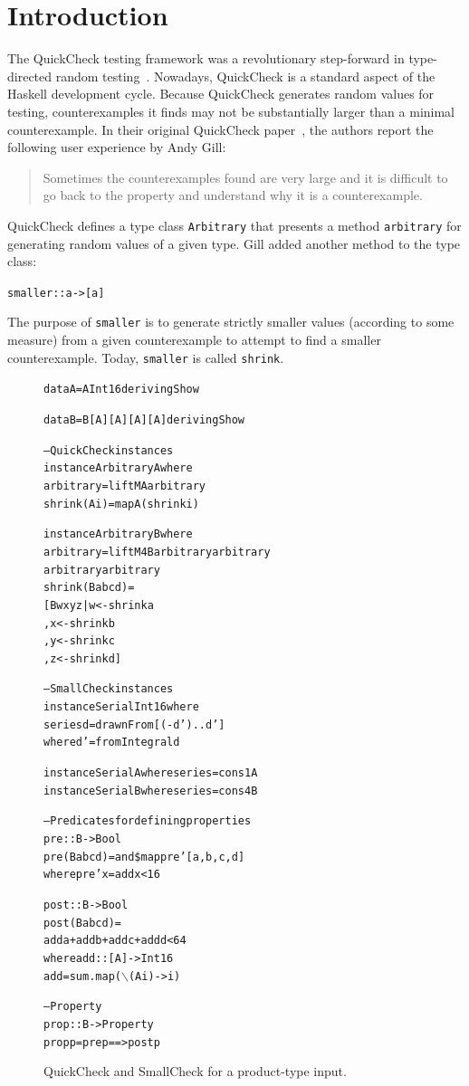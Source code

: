 \documentclass[10pt]{sigplanconf}
\newenvironment{code}{\begin{alltt}}{\end{alltt}}
\newcommand{\ttp}[1]{\texttt{#1}}
\begin{document}
\section{Introduction}\label{sec:intro}
The QuickCheck testing framework was a revolutionary step-forward in
type-directed random testing~\cite{qc}.  Nowadays, QuickCheck is a standard
aspect of the Haskell development cycle.  Because QuickCheck generates random
values for testing, counterexamples it finds may not be substantially larger
than a minimal counterexample.  In their original QuickCheck paper~\cite{qc},
the authors report the following user experience by Andy Gill:
%
\begin{quote}
Sometimes the counterexamples found are very large and it is difficult to go
back to the property and understand why it is a counterexample.
\end{quote}
%
\noindent
QuickCheck defines a type class \ttp{Arbitrary} that presents a method
\ttp{arbitrary} for generating random values of a given type.  Gill added another
method to the type class:
%
\begin{code}
smaller :: a -> [a]
\end{code}
%
\noindent
The purpose of \ttp{smaller} is to generate strictly smaller values (according to
some measure) from a given counterexample to attempt to find a smaller
counterexample.  Today, \ttp{smaller} is called \ttp{shrink}.

\begin{figure}[ht]
\begin{code}
data A = A Int16 deriving Show

data B = B [A] [A] [A] [A] deriving Show

-- QuickCheck instances
instance Arbitrary A where
  arbitrary    = liftM A arbitrary
  shrink (A i) = map A (shrink i)

instance Arbitrary B where
  arbitrary = liftM4 B arbitrary arbitrary
                       arbitrary arbitrary
  shrink (B a b c d) =
    [ B w x y z | w <- shrink a
                , x <- shrink b
                , y <- shrink c
                , z <- shrink d ]

-- SmallCheck instances
instance Serial Int16 where
  series d = drawnFrom [(-d')..d']
    where d' = fromIntegral d

instance Serial A where series = cons1 A
instance Serial B where series = cons4 B

-- Predicates for defining properties
pre :: B -> Bool
pre (B a b c d) = and \$ map pre' [a, b, c, d]
  where pre' x = add x < 16

post :: B -> Bool
post (B a b c d) =
  add a + add b + add c + add d < 64
  where add :: [A] -> Int16
        add = sum . map (\(\backslash\)(A i) -> i)

-- Property
prop :: B -> Property
prop p = pre p ==> post p
\end{code}
  \caption{QuickCheck and SmallCheck for a product-type input.}
  \label{fig:initial}
\end{figure}
\end{document}
